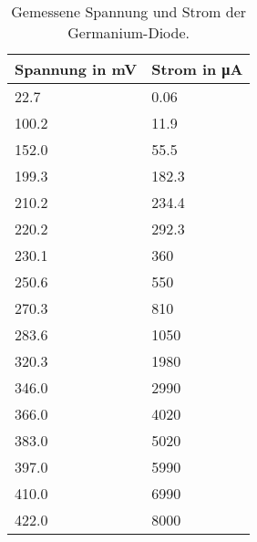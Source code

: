 \documentclass[
12pt,
a4paper,
bibliography=totocnumbered, %
BCOR=1cm, %
oneside, %
]{scrartcl}
\begin{document}
\begin{table}[H]
	\centering %
	\caption{Gemessene Spannung und Strom der Germanium-Diode.\label{tbl:GeDiode}}
	\begin{tabular}{ll}
		\toprule
		Spannung in \si{\milli\volt} & Strom in \si{\micro\ampere} \\
		\midrule
		\num{22,7}  & \num{0,06}  \\
		\num{100,2} & \num{11,9}  \\
		\num{152,0} & \num{55,5}  \\
		\num{199,3} & \num{182,3} \\
		\num{210,2} & \num{234,4} \\
		\num{220,2} & \num{292,3} \\
		\num{230,1} & \num{360}   \\
		\num{250,6} & \num{550}   \\
		\num{270,3} & \num{810}   \\
		\num{283,6} & \num{1050}  \\
		\num{320,3} & \num{1980}  \\
		\num{346,0} & \num{2990}  \\
		\num{366,0} & \num{4020}  \\
		\num{383,0} & \num{5020}  \\
		\num{397,0} & \num{5990}  \\
		\num{410,0} & \num{6990}  \\
		\num{422,0} & \num{8000}  \\
		\bottomrule
	\end{tabular}
\end{table}
\end{document}
